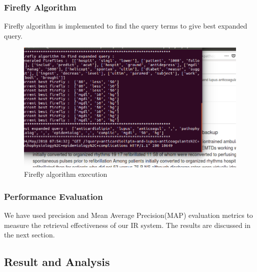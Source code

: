 \documentclass{nitk}
\begin{document}
 \subsubsection{Firefly Algorithm}
 Firefly algorithm is implemented to find the query terms to give best expanded query.
 \begin{figure}[ht]
 \centering
 \includegraphics[scale=0.5]{firefly_execution}
 \caption{Firefly algorithm execution}
 \end{figure}
 \subsubsection{Performance Evaluation}
 We have used precision and Mean Average Precision(MAP) evaluation metrics to measure the retrieval effectiveness of our IR system. The results are discussed in the next section.
 \newpage
 \subsection{Result and Analysis}
\end{document}
